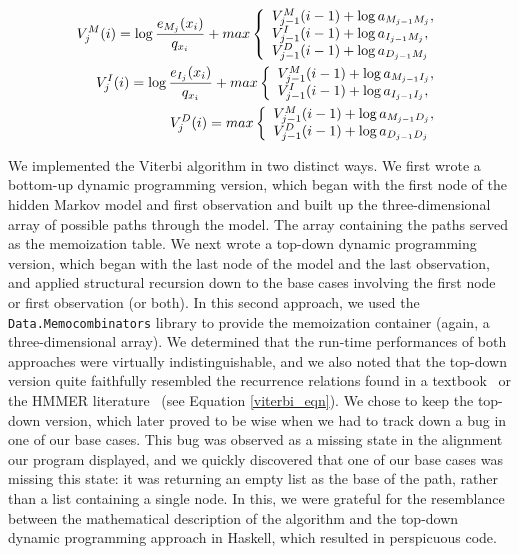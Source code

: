 \documentclass[preprint]{sigplanconf}
\begin{document}
\begin{eqnarray}    
V_{j}^{M}(i) = \log\frac{e_{M_{j}}(x_{i})}{q_{x_{i}}} + max \left\{
\begin{array}{l l}
V_{j-1}^{M}(i - 1) + \log a_{M_{j-1}M_{j}},\\
V_{j-1}^{I}(i - 1) + \log a_{I_{j-1}M_{j}},\\
V_{j-1}^{D}(i - 1) + \log a_{D_{j-1}M_{j}}\\
\end{array} \right.\nonumber\\
V_{j}^{I}(i) = \log\frac{e_{I_{j}}(x_{i})}{q_{x_{i}}} + max \left\{
\begin{array}{l l}
V_{j-1}^{M}(i - 1) + \log a_{M_{j-1}I_{j}},\\
V_{j-1}^{I}(i - 1) + \log a_{I_{j-1}I_{j}},\\
\end{array} \right.\nonumber\\
V_{j}^{D}(i) = max \left\{
\begin{array}{l l}
V_{j-1}^{M}(i - 1) + \log a_{M_{j-1}D_{j}},\\
V_{j-1}^{D}(i - 1) + \log a_{D_{j-1}D_{j}}\\
\end{array} \right.\nonumber\\
\end{eqnarray}\label{viterbi_eqn}



We implemented the Viterbi algorithm in two distinct ways. We first wrote a 
bottom-up dynamic programming version, which began with the first node of the 
hidden Markov model and first observation and built up the three-dimensional 
array of possible paths through the model. The array containing the paths 
served as the memoization table. We next wrote a top-down dynamic programming 
version, which began with the last node of the model and the last observation, 
and applied structural recursion down to the base cases involving the first 
node or first observation (or both). In this second approach, we used the 
\texttt{Data.Memocombinators} library to provide the memoization container 
(again, a three-dimensional array). We determined that the run-time 
performances of both approaches were virtually indistinguishable, and we also 
noted that the top-down version quite faithfully resembled the recurrence 
relations found in a textbook~\cite{durbin} or the HMMER literature~\cite{eddy} 
(see Equation \ref{viterbi_eqn}). We chose to keep the top-down version, which 
later proved to be wise when we had to track down a bug in one of our base 
cases. This bug was observed as a missing state in the alignment our program 
displayed, and we quickly discovered that one of our base cases was missing 
this state: it was returning an empty list as the base of the path, rather than 
a list containing a single node. In this, we were grateful for the resemblance 
between the mathematical description of the algorithm and the top-down dynamic 
programming approach in Haskell, which resulted in perspicuous code.
\end{document}
